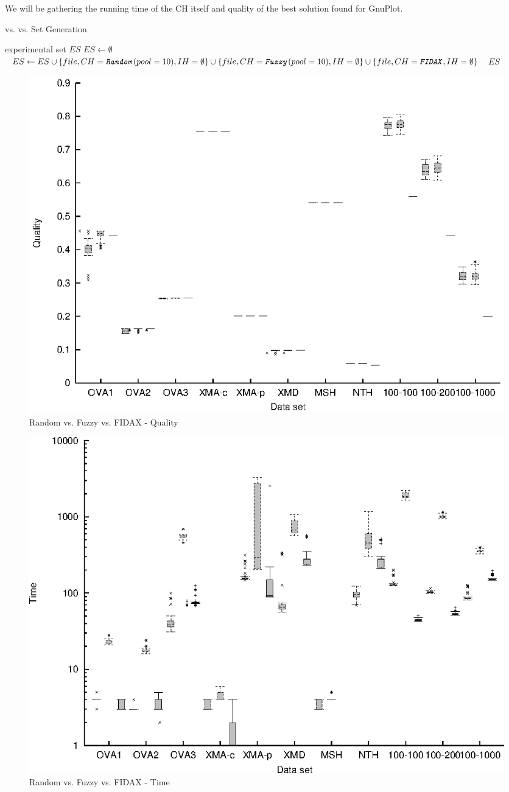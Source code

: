 We will be gathering the running time of the CH itself and quality of the best solution found for GnuPlot.\\

\begin{algorithm}
\caption{ vs.  vs.  Set Generation}
\label{listing-experiment-random-fuzzy-fidax}
\begin{algorithmic}
\ENSURE experimental set $ES$
\STATE $ES \gets \emptyset$
    \STATE $ES \gets ES \cup \{file, CH = \texttt{\textit{Random}}(pool = 10), IH = \emptyset\} \cup \{file, CH = \texttt{\textit{Fuzzy}}(pool = 10), IH = \emptyset\} \cup \{file, CH = \texttt{\textit{FIDAX}}, IH = \emptyset\}$
  \ENDFOR
\ENDFOR
\RETURN $ES$
\end{algorithmic}
\end{algorithm}

\begin{figure}
  \caption{Random vs. Fuzzy vs. FIDAX - Quality}
  \label{image-experiment-random-fuzzy-fidax-quality}
  \centering
    \includegraphics[width=\textwidth]{images/experiments/random-fuzzy-fidax-quality}
\end{figure}

\begin{figure}
  \caption{Random vs. Fuzzy vs. FIDAX - Time}
  \label{image-experiment-random-fuzzy-fidax-time}
  \centering
    \includegraphics[width=\textwidth]{images/experiments/random-fuzzy-fidax-time}
\end{figure}

